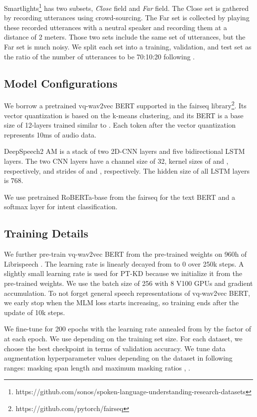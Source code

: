 Smartlights\footnote{https://github.com/sonos/spoken-language-understanding-research-datasets} \cite{saade2018spoken} has two subsets, \textit{Close} field and \textit{Far} field.
The Close set is gathered by recording utterances using crowd-sourcing.
The Far set is collected by playing these recorded utterances with a neutral speaker and recording them at a distance of 2 meters.
Those two sets include the same set of utterances, but the Far set is much noisy.
We split each set into a training, validation, and test set as the ratio of the number of utterances to be 70:10:20 following \cite{bhosale2019end}.


\subsection{Model Configurations}

We borrow a pretrained vq-wav2vec BERT supported in the fairseq \cite{ott2019fairseq} library\footnote{https://github.com/pytorch/fairseq}.
Its vector quantization is based on the k-means clustering, and its BERT is a base size of 12-layers trained similar to \cite{liu2019roberta}.
Each token after the vector quantization represents 10ms of audio data.

DeepSpeech2 AM is a stack of two 2D-CNN layers and five bidirectional LSTM layers.
The two CNN layers have a channel size of 32, kernel sizes of  and , respectively, and strides of  and , respectively.
The hidden size of all LSTM layers is 768.

We use pretrained RoBERTa-base \cite{liu2019roberta} from the fairseq for the text BERT and a softmax layer for intent classification.


\subsection{Training Details}

We further pre-train vq-wav2vec BERT from the pre-trained weights on 960h of Librispeech \cite{panayotov2015librispeech}.
The learning rate is linearly decayed from  to 0 over 250k steps.
A slightly small learning rate is used for PT-KD because we initialize it from the pre-trained weights.
We use the batch size of 256 with 8 V100 GPUs and gradient accumulation.
To not forget general speech representations of vq-wav2vec BERT, we early stop when the MLM loss starts increasing, so training ends after the update of 10k steps. 

We fine-tune for 200 epochs with the learning rate annealed from  by the factor of  at each epoch.
We use  depending on the training set size.
For each dataset, we choose the best checkpoint in terms of validation accuracy.
We tune data augmentation hyperparameter values depending on the dataset in following ranges:
masking span length  and maximum masking ratios , .  


